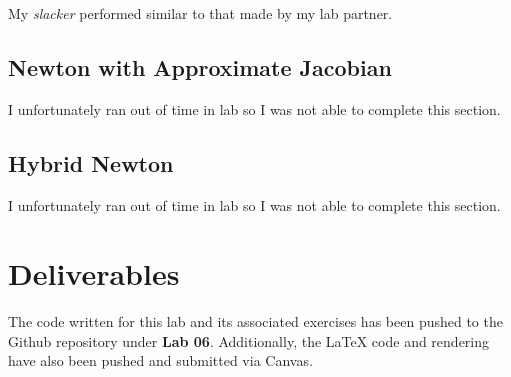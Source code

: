 \documentclass{article}
\begin{document}
\subsubsection{}
My \textit{slacker} performed similar to that made by my lab partner.

\subsection{Newton with Approximate Jacobian}
I unfortunately ran out of time in lab so I was not able to complete this section.

\subsection{Hybrid Newton}
I unfortunately ran out of time in lab so I was not able to complete this section.

\section{Deliverables}
The code written for this lab and its associated exercises has been pushed to the Github repository under \textbf{Lab 06}. Additionally, the LaTeX code and rendering have also been pushed and submitted via Canvas.
\end{document}
